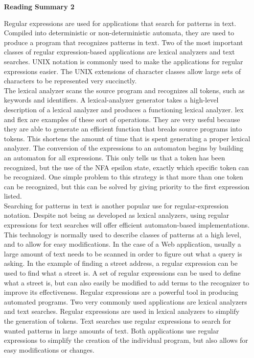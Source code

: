 \documentclass[11pt]{article}
\begin{document}
\pagebreak
\setlength{\parindent}{1cm}
\centerline{\bf Reading Summary 2}

\begin{spacing}{1.5}
 Regular expressions are used for applications that search for patterns in text. Compiled into deterministic or 
 non-deterministic automata, they are used to produce a program that recognizes patterns in text. Two of the most
 important classes of regular expression-based applications are lexical analyzers and text searches. UNIX notation
 is commonly used  to make the applications for regular expressions easier. The UNIX extensions of character 
 classes allow large sets of characters to be represented very succinctly.  \\
 \indent The lexical analyzer scans the source program and recognizes all tokens, such as keywords and identifiers. A 
 lexical-analyzer generator takes a high-level description of a lexical analyzer and produces a functioning lexical
 analyzer. lex and flex are examples of these sort of operations. They are very useful because they are able to
 generate an efficient function that breaks source programs into tokens. This shortens the amount of time that is
 spent generating a proper lexical analyzer. The conversion of the expressions to an automaton begins by building
 an automaton for all expressions. This only tells us that a token has been recognized, but the use of the NFA
 epsilon state, exactly which specific token can be recognized. One simple problem to this strategy is that more
 than one token can be recognized, but this can be solved by giving priority to the first expression listed. \\
 \indent Searching for patterns in text is another popular use for regular-expression notation. Despite not being
 as developed as lexical analyzers, using regular expressions for text searches will offer efficient automaton-based
 implementations. This technology is normally used to describe classes of patterns at a high level, and to allow
 for easy modifications. In the case of a Web application, usually a large amount of text needs to be scanned in
 order to figure out what a query is asking. In the example of finding a street address, a regular expression can
 be used to find what a street is. A set of regular expressions can be used to define what a street is, but can
 also easily be modified to add terms to the recognizer to improve its effectiveness.
 \indent Regular expressions are a powerful tool in producing automated programs. Two very commonly used applications
 are lexical analyzers and text searches. Regular expressions are used in lexical analyzers to simplify the 
 generation of tokens. Text searches use regular expressions to search for wanted patterns in large amounts of text.
 Both applications use regular expressions to simplify the creation of the individual program, but also allows for
 easy modifications or changes.
\end{spacing}
\end{document}
